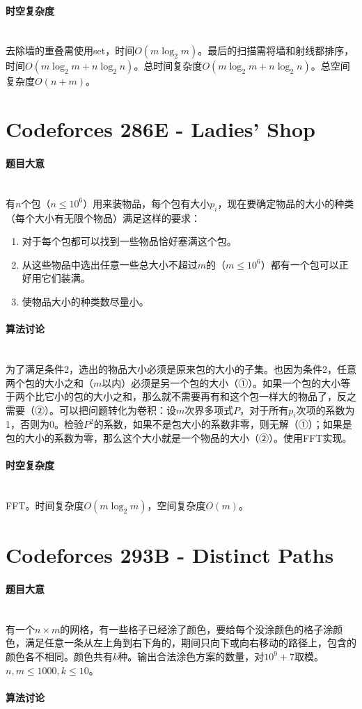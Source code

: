 \documentclass[UTF8]{ctexart}
\newcommand{\myparagraph}[1]{\paragraph{#1}\mbox{}\\}
\theoremstyle{nonumberplain}
\begin{document}
		\myparagraph{时空复杂度}
		
			去除墙的重叠需使用set，时间$O(m\log_2m)$。最后的扫描需将墙和射线都排序，时间$O(m\log_2m + n\log_2n)$。总时间复杂度$O(m\log_2m + n\log_2n)$。总空间复杂度$O(n+m)$。
	
	\section{Codeforces 286E - Ladies' Shop}
	
		\myparagraph{题目大意}
		
			有$n$个包（$n \leq 10^6$）用来装物品，每个包有大小$p_i$，现在要确定物品的大小的种类（每个大小有无限个物品）满足这样的要求：
			
			\begin{enumerate}
				\item 对于每个包都可以找到一些物品恰好塞满这个包。
				\item 从这些物品中选出任意一些总大小不超过$m$的（$m \leq 10^6$）都有一个包可以正好用它们装满。
				\item 使物品大小的种类数尽量小。
			\end{enumerate}
		
		\myparagraph{算法讨论}
		
			为了满足条件2，选出的物品大小必须是原来包的大小的子集。也因为条件2，任意两个包的大小之和（$m$以内）必须是另一个包的大小（①）。如果一个包的大小等于两个比它小的包的大小之和，那么就不需要再有和这个包一样大的物品了，反之需要（②）。可以把问题转化为卷积：设$m$次界多项式$P$，对于所有$p_i$次项的系数为1，否则为0。检验$P^2$的系数，如果不是包大小的系数非零，则无解（①）；如果是包的大小的系数为零，那么这个大小就是一个物品的大小（②）。使用FFT实现。
		
		\myparagraph{时空复杂度}
		
			FFT。时间复杂度$O(m\log_2m)$，空间复杂度$O(m)$。
	
	\section{Codeforces 293B - Distinct Paths}
	
		\myparagraph{题目大意}
		
			有一个$n \times m$的网格，有一些格子已经涂了颜色，要给每个没涂颜色的格子涂颜色，满足任意一条从左上角到右下角的，期间只向下或向右移动的路径上，包含的颜色各不相同。颜色共有$k$种。输出合法涂色方案的数量，对$10^9+7$取模。$n,m \leq 1000, k \leq 10$。
		
		\myparagraph{算法讨论}
		
\end{document}

